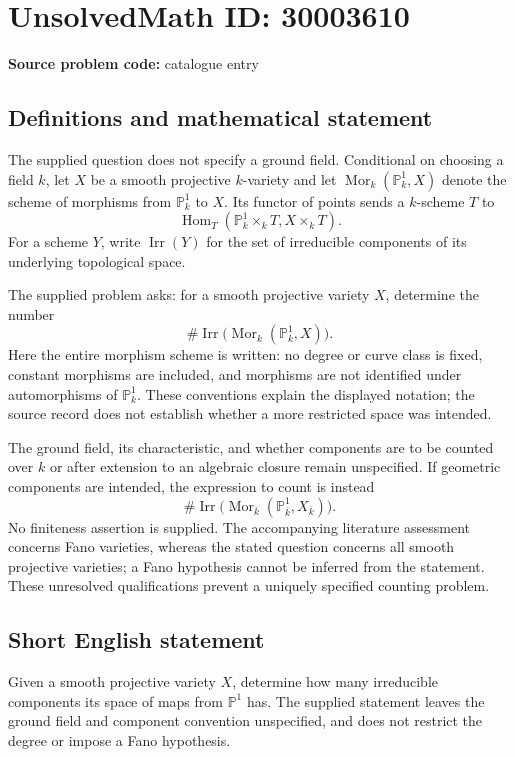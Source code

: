 \documentclass[11pt]{article}
\begin{document}
\section*{UnsolvedMath ID: 30003610}
\textbf{Source problem code:} catalogue entry
\subsection{Definitions and mathematical statement}
The supplied question does not specify a ground field. Conditional on choosing a field \(k\), let \(X\) be a smooth projective \(k\)-variety and let \(\operatorname{Mor}_k(\mathbb P^1_k,X)\) denote the scheme of morphisms from \(\mathbb P^1_k\) to \(X\). Its functor of points sends a \(k\)-scheme \(T\) to
\[
\operatorname{Hom}_T(\mathbb P^1_k\times_k T, X\times_k T).
\]
For a scheme \(Y\), write \(\operatorname{Irr}(Y)\) for the set of irreducible components of its underlying topological space.

The supplied problem asks: for a smooth projective variety \(X\), determine the number
\[
\#\operatorname{Irr}\bigl(\operatorname{Mor}_k(\mathbb P^1_k,X)\bigr).
\]
Here the entire morphism scheme is written: no degree or curve class is fixed, constant morphisms are included, and morphisms are not identified under automorphisms of \(\mathbb P^1_k\). These conventions explain the displayed notation; the source record does not establish whether a more restricted space was intended.

The ground field, its characteristic, and whether components are to be counted over \(k\) or after extension to an algebraic closure remain unspecified. If geometric components are intended, the expression to count is instead
\[
\#\operatorname{Irr}\bigl(\operatorname{Mor}_{\overline{k}}(\mathbb P^1_{\overline{k}},X_{\overline{k}})\bigr).
\]
No finiteness assertion is supplied. The accompanying literature assessment concerns Fano varieties, whereas the stated question concerns all smooth projective varieties; a Fano hypothesis cannot be inferred from the statement. These unresolved qualifications prevent a uniquely specified counting problem.
\subsection{Short English statement}
Given a smooth projective variety \(X\), determine how many irreducible components its space of maps from \(\mathbb P^1\) has. The supplied statement leaves the ground field and component convention unspecified, and does not restrict the degree or impose a Fano hypothesis.
\end{document}
